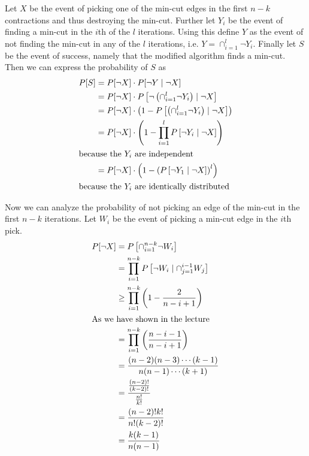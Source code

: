 \documentclass[10pt,a4paper]{article}
\begin{document}
Let $X$ be the event of picking one of the min-cut edges in the first $n - k$ contractions and thus destroying the min-cut.
Further let $Y_{i}$ be the event of finding a min-cut in the $i$th of the $l$ iterations.
Using this define $Y$ as the event of not finding the min-cut in any of the $l$ iterations, i.e. $Y = \cap_{i = 1}^{l} \lnot Y_{i}$.
Finally let $S$ be the event of success, namely that the modified algorithm finds a min-cut.
Then we can express the probability of $S$ as
\begin{align*}
  P[S] & = P[\lnot X] \cdot P[\lnot Y \mid \lnot X]\\
       & = P[\lnot X] \cdot P\left[ \lnot \left( \cap_{i = 1}^{l} \lnot Y_{i} \right) \mid \lnot X \right]\\
       & = P[\lnot X] \cdot \left( 1 - P\left[ \left( \cap_{i = 1}^{l} \lnot Y_{i} \right) \mid \lnot X \right] \right)\\
       & = P[\lnot X] \cdot \left( 1 - \prod_{i = 1}^{l} P\left[ \lnot Y_{i} \mid \lnot X \right] \right)\\
  \intertext{because the $Y_{i}$ are independent}
       & = P[\lnot X] \cdot \left( 1 - \left( P\left[ \lnot Y_{1} \mid \lnot X \right] \right)^{l} \right)\\
  \intertext{because the $Y_{i}$ are identically distributed}
\end{align*}

Now we can analyze the probability of not picking an edge of the min-cut in the first $n - k$ iterations.
Let $W_{i}$ be the event of picking a min-cut edge in the $i$th pick.
\begin{align*}
  P[\lnot X] & = P\left[ \cap_{i = 1}^{n - k} \lnot W_{i} \right]\\
             & = \prod_{i = 1}^{n - k} P\left[ \lnot W_{i} \mid \cap_{j = 1}^{i - 1} W_{j} \right]\\
             & \ge \prod_{i = 1}^{n - k} \left( 1 - \frac{2}{n - i + 1} \right)\\
  \intertext{As we have shown in the lecture}
             & = \prod_{i = 1}^{n - k} \left( \frac{n - i - 1}{n - i + 1} \right)\\
             & = \frac{(n - 2)(n - 3) \cdots (k - 1)}{n(n - 1) \cdots (k + 1)}\\
             & = \frac{\frac{(n - 2)!}{(k - 2)!}}{\frac{n!}{k!}}\\
             & = \frac{(n - 2)!k!}{n!(k - 2)!}\\
             & = \frac{k(k - 1)}{n(n - 1)}
\end{align*}
\end{document}
